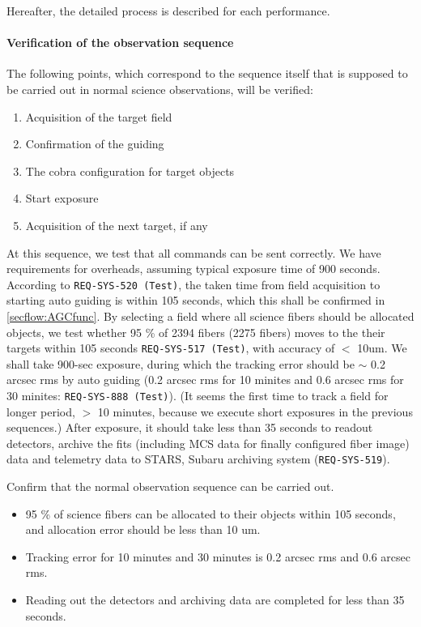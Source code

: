 Hereafter, the detailed process is described for each performance.

\paragraph{Verification of the observation sequence}
The following points, which correspond to the sequence itself that is supposed to be carried out in normal science observations, will be verified:

\begin{enumerate}
\item{Acquisition of the target field}
\item{Confirmation of the guiding}
\item{The cobra configuration for target objects}
\item{Start exposure}
\item{Acquisition of the next target, if any}
\end{enumerate}

At this sequence, we test that all commands can be sent correctly.
We have requirements for overheads, assuming typical exposure time of 900 seconds.
According to {\tt REQ-SYS-520 (Test)}, the taken time from field acquisition to starting auto guiding is within 105 seconds, which this shall be confirmed in \ref{secflow:AGCfunc}.
By selecting a field where all science fibers should be allocated objects, we test whether 95 \% of 2394 fibers (2275 fibers) moves to the their targets within 105 seconds {\tt REQ-SYS-517 (Test)}, with accuracy of $<$ 10um. 
We shall take 900-sec exposure, during which the tracking error should be $\sim$ 0.2 arcsec rms by auto guiding (0.2 arcsec rms for 10 minites and 0.6 arcsec rms for 30 minites: {\tt REQ-SYS-888 (Test)}).
(It seems the first time to track a field for longer period, $>$ 10 minutes, because we execute short exposures in the previous sequences.)
After exposure, it should take less than 35 seconds to readout detectors, archive the fits (including MCS data for finally configured fiber image) data and telemetry data to STARS, Subaru archiving system ({\tt REQ-SYS-519}). 


\begin{itembox}[l]{}
Confirm that the normal observation sequence can be carried out.
\begin{itemize}
\item 95 \% of science fibers can be allocated to their objects within 105 seconds, and allocation error should be less than 10 um. 
\item Tracking error for 10 minutes and 30 minutes is 0.2 arcsec rms and 0.6 arcsec rms. 
\item Reading out the detectors and archiving data are completed for less than 35 seconds. 
\end{itemize}
\end{itembox}

